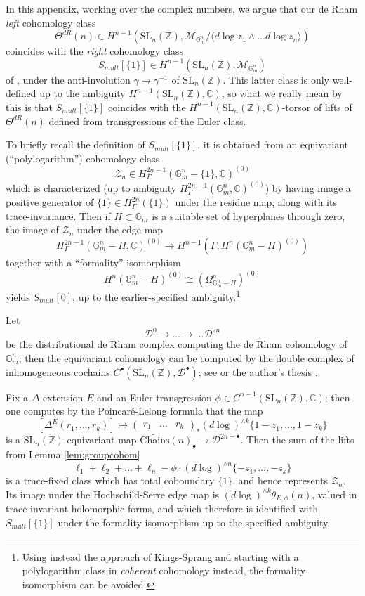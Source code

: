 \documentclass[10pt]{amsart}
\theoremstyle{definition}
\newcommand{\Z}{\mathbb{Z}}
\newcommand{\cZ}{\mathcal{Z}}
\newcommand{\C}{\mathbb{C}}
\newcommand{\Chains}{\mathrm{Chains}}
\newcommand{\G}{\mathbb{G}}
\newcommand{\SL}{\mathrm{SL}}
\numberwithin{equation}{section}
\begin{document}
    In this appendix, working over the complex numbers, we argue that our de Rham \emph{left} cohomology class 
    \[
        \Theta^{dR}(n)\in H^{n-1}(\SL_n(\Z),\mathcal{M}_{\G_m^n}/\langle d\log z_1 \wedge \ldots d\log z_n\rangle)
    \]
    coincides with the \emph{right} cohomology class 
    \[
    S_{mult}[\{1\}]\in H^{n-1}(\SL_n(\Z),\mathcal{M}_{\G_m^n})
    \]
    of \cite[Théorème 1.7]{BCGV}, under the anti-involution $\gamma\mapsto \gamma^{-1}$ of $\SL_n(\Z)$. This latter class is only well-defined up to the ambiguity $H^{n-1}(\SL_n(\Z),\C)$, so what we really mean by this is that $S_{mult}[\{1\}]$ coincides with the $H^{n-1}(\SL_n(\Z),\C)$-torsor of lifts of $\Theta^{dR}(n)$ defined from transgressions of the Euler class.
    
    To briefly recall the definition of $S_{mult}[\{1\}]$, it is obtained from an equivariant (``polylogarithm'') cohomology class 
    \[
        \cZ_n \in H^{2n-1}_\Gamma(\G_m^n-\{1\}, \C)^{(0)}
    \]
    which is characterized (up to ambiguity $H^{2n-1}_\Gamma(\G_m^n, \C)^{(0)}$) by having image a positive generator of $\{1\}\in H^{2n}_\Gamma(\{1\})$ under the residue map, along with its trace-invariance. Then if $H\subset \G_m$ is a suitable set of hyperplanes through zero, the image of $\cZ_n$ under the edge map
    \[
        H^{2n-1}_\Gamma(\G_m^n-H, \C)^{(0)} \to H^{n-1}(\Gamma, H^{n}(\G_m^n-H)^{(0)})
    \]
    together with a ``formality'' isomorphism
    \[
        H^{n}(\G_m^n-H)^{(0)} \cong (\Omega^n_{\G_m^n-H})^{(0)}
    \]
    yields $S_{mult}[{0}]$, up to the earlier-specified ambiguity.\footnote{Using instead the approach of Kings-Sprang \cite{KS} and starting with a polylogarithm class in \emph{coherent} cohomology instead, the formality isomorphism can be avoided.}

    Let 
        \[
        \mathcal{D}^0\to \ldots \to \ldots \mathcal{D}^{2n}
        \]
    be the distributional de Rham complex computing the de Rham cohomology of $\G_m^n$; then the equivariant cohomology can be computed by the double complex of inhomogeneous cochains $C^\bullet(\SL_n(\Z), \mathcal{D}^\bullet)$; see \cite{RX2} or the author's thesis \cite{X}. 

    Fix a $\Delta$-extension $E$ and an Euler transgression $\phi\in C^{n-1}(\SL_n(\Z), \C)$; then one computes by the Poincaré-Lelong formula that the map
    \[
        [\Delta^E(r_1,\ldots, r_k)]\mapsto \begin{pmatrix}r_1 & \ldots & r_k\end{pmatrix}_* (d\log)^{\wedge k} \{1-z_1,\ldots, 1-z_k\}
    \]
    is a $\SL_n(\Z)$-equivariant map $\widetilde{\Chains}(n)_{\bullet}\to \mathcal{D}^{2n-\bullet}$. Then the sum of the lifts from Lemma \ref{lem:groupcohom}
    \[
        \ell_1+\ell_2+\ldots + \ell_n-\phi\cdot (d\log)^{\wedge n} \{-z_1,\ldots, -z_k\}
    \]
    is a trace-fixed class which has total coboundary $\{1\}$, and hence represents $\cZ_n$. Its image under the Hochschild-Serre edge map is $(d\log)^{\wedge k}\theta_{E,\phi}(n)$, valued in trace-invariant holomorphic forms, and which therefore is identified with $S_{mult}[\{1\}]$ under the formality isomorphism up to the specified ambiguity.
\end{document}
